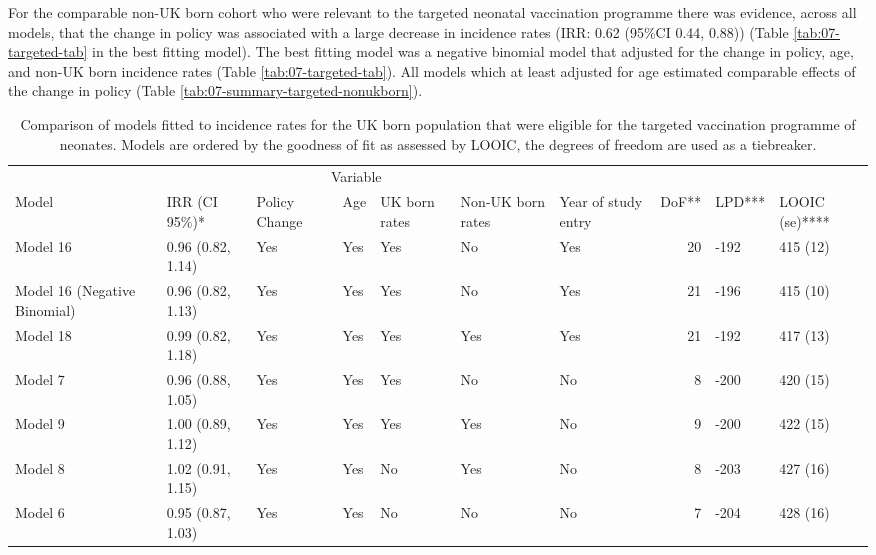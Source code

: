 \documentclass[11pt,twoside]{bristolthesis}
\begin{document}
  For the comparable non-UK born cohort who were relevant to the targeted neonatal vaccination programme there was evidence, across all models, that the change in policy was associated with a large decrease in incidence rates (IRR: 0.62 (95\%CI 0.44, 0.88)) (Table \ref{tab:07-targeted-tab} in the best fitting model). The best fitting model was a negative binomial model that adjusted for the change in policy, age, and non-UK born incidence rates (Table \ref{tab:07-targeted-tab}). All models which at least adjusted for age estimated comparable effects of the change in policy (Table \ref{tab:07-summary-targeted-nonukborn}).
  \begin{landscape}\begin{table}[!h]
  
  \caption[Comparison of models fitted to incidence rates for the UK born population that were eligible for the targeted vaccination programme of neonates.]{\label{tab:07-summary-targeted-ukborn}Comparison of models fitted to incidence rates for the UK born population that were eligible for the targeted vaccination programme of neonates. Models are ordered by the goodness of fit as assessed by LOOIC, the degrees of freedom are used as a tiebreaker.}
  \centering
  \fontsize{8}{10}\selectfont
  \begin{tabular}{>{\raggedright\arraybackslash}p{3cm}llllllrll}
  \toprule
  \multicolumn{2}{c}{ } & \multicolumn{5}{c}{Variable} & \multicolumn{3}{c}{ } \\
  \cmidrule(l{3pt}r{3pt}){3-7}
  Model & IRR (CI 95\%)* & Policy Change & Age & UK born rates & Non-UK born rates & Year of study entry & DoF** & LPD*** & LOOIC (se)****\\
  \midrule
  Model 16 & 0.96 (0.82, 1.14) & Yes & Yes & Yes & No & Yes & 20 & -192 & 415 (12)\\
  Model 16 (Negative Binomial) & 0.96 (0.82, 1.13) & Yes & Yes & Yes & No & Yes & 21 & -196 & 415 (10)\\
  Model 18 & 0.99 (0.82, 1.18) & Yes & Yes & Yes & Yes & Yes & 21 & -192 & 417 (13)\\
  Model 7 & 0.96 (0.88, 1.05) & Yes & Yes & Yes & No & No & 8 & -200 & 420 (15)\\
  Model 9 & 1.00 (0.89, 1.12) & Yes & Yes & Yes & Yes & No & 9 & -200 & 422 (15)\\
  \addlinespace
  Model 8 & 1.02 (0.91, 1.15) & Yes & Yes & No & Yes & No & 8 & -203 & 427 (16)\\
  Model 6 & 0.95 (0.87, 1.03) & Yes & Yes & No & No & No & 7 & -204 & 428 (16)\\

\end{tabular}
\end{table}
\end{landscape}
\end{document}
